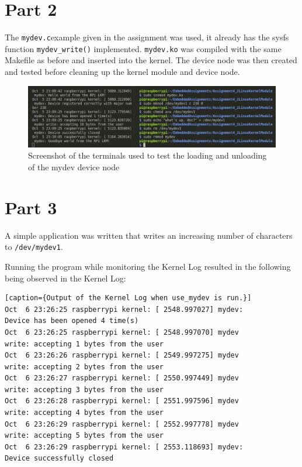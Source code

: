 \documentclass{article}
\begin{document}
\newpage
\section*{Part 2}
The \verb"mydev.c"example given in the assignment was used, it already has the sysfs function \verb!mydev_write()! implemented. \verb!mydev.ko! was compiled with the same Makefile as before and inserted into the kernel. The device node was then created and tested before cleaning up the kernel module and device node.

\begin{figure}[h]
    \centering
    \includegraphics[width=\textwidth]{Assignment4_2LinuxKernelModule/part2_device.png}
    \caption{Screenshot of the terminals used to test the loading and unloading of the mydev device node}
    \label{fig:kernel_loading}
\end{figure}

\section*{Part 3}
A simple application was written that writes an increasing number of characters to \verb!/dev/mydev1!.



Running the program while monitoring the Kernel Log resulted in the following being observed in the Kernel Log:

\begin{verbatim}[caption={Output of the Kernel Log when use_mydev is run.}]
Oct  6 23:26:25 raspberrypi kernel: [ 2548.997027] mydev:
Device has been opened 4 time(s)
Oct  6 23:26:25 raspberrypi kernel: [ 2548.997070] mydev
write: accepting 1 bytes from the user
Oct  6 23:26:26 raspberrypi kernel: [ 2549.997275] mydev 
write: accepting 2 bytes from the user
Oct  6 23:26:27 raspberrypi kernel: [ 2550.997449] mydev 
write: accepting 3 bytes from the user
Oct  6 23:26:28 raspberrypi kernel: [ 2551.997596] mydev 
write: accepting 4 bytes from the user
Oct  6 23:26:29 raspberrypi kernel: [ 2552.997778] mydev 
write: accepting 5 bytes from the user
Oct  6 23:26:29 raspberrypi kernel: [ 2553.118693] mydev: 
Device successfully closed
\end{verbatim}
\end{document}
